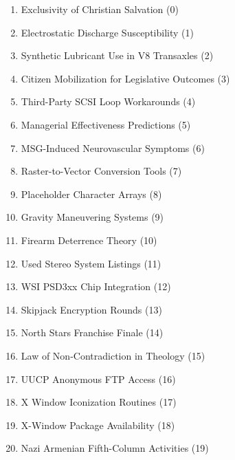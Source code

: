 \begin{enumerate}
\item Exclusivity of Christian Salvation (0)
\item Electrostatic Discharge Susceptibility (1)
\item Synthetic Lubricant Use in V8 Transaxles (2)
\item Citizen Mobilization for Legislative Outcomes (3)
\item Third-Party SCSI Loop Workarounds (4)
\item Managerial Effectiveness Predictions (5)
\item MSG-Induced Neurovascular Symptoms (6)
\item Raster-to-Vector Conversion Tools (7)
\item Placeholder Character Arrays (8)
\item Gravity Maneuvering Systems (9)
\item Firearm Deterrence Theory (10)
\item Used Stereo System Listings (11)
\item WSI PSD3xx Chip Integration (12)
\item Skipjack Encryption Rounds (13)
\item North Stars Franchise Finale (14)
\item Law of Non-Contradiction in Theology (15)
\item UUCP Anonymous FTP Access (16)
\item X Window Iconization Routines (17)
\item X-Window Package Availability (18)
\item Nazi Armenian Fifth-Column Activities (19)
\end{enumerate}

